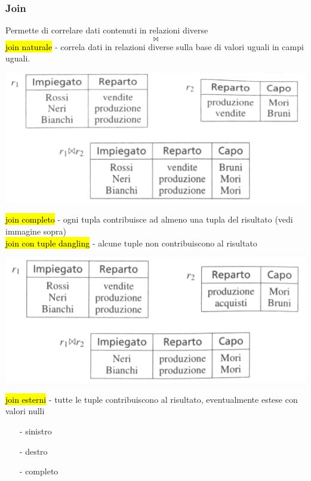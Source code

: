\documentclass[a4paper]{article}
\begin{document}
\subsubsection{Join}
Permette di correlare dati contenuti in relazioni diverse
\[\Join\]
%
\hl{join naturale} - correla dati in relazioni diverse sulla base di valori uguali in campi uguali.
\begin{center}
      \includegraphics[scale=0.45]{img/ar6.png}
\end{center}
%
\hl{join completo} - ogni tupla contribuisce ad almeno una tupla del risultato (vedi immagine sopra)\medskip\\
%
\hl{join con tuple dangling} - alcune tuple non contribuiscono al risultato
\begin{center}
      \includegraphics[scale=0.45]{img/ar7.png}
\end{center}
%
\hl{join esterni} - tutte le tuple contribuiscono al risultato, eventualmente estese con valori nulli
\begin{itemize}[noitemsep]
  \item [-] sinistro
  \item [-] destro
  \item [-] completo
\end{itemize}
\end{document}
